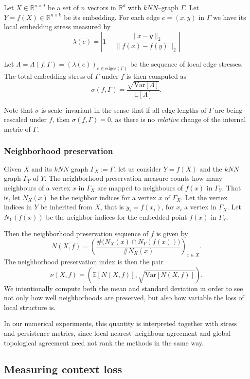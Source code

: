 \documentclass[11pt]{article}
\begin{document}
Let $X \in \mathbb{R}^{n\times d}$ be a set of $n$ vectors in $\mathbb{R}^d$ with $kNN$--graph $\Gamma$. Let $Y = f(X) \in \mathbb{R}^{n\times k}$ be its embedding. For each edge $e = (x,y)$ in $\Gamma$ we have its local embedding stress measured by 
\[
\lambda(e) = \left| 1 - \frac{\|x-y\|_2}{\|f(x) - f(y)\|_2}  \right|
\]

Let $\Lambda = \Lambda(f, \Gamma) = (\lambda(e))_{e \in \text{edges}(\Gamma)}$ be the sequence of local edge stresses.  The total embedding stress of $\Gamma$ under $f$ is then computed as 
\[
\sigma(f, \Gamma) = \frac{\sqrt{\mathrm{Var}[ \Lambda]}}{\mathbb{E}[\Lambda]}.
\]

Note that $\sigma$ is scale--invariant in the sense that if all edge lengths of $\Gamma$ are being rescaled under $f$, then  $\sigma(f, \Gamma) = 0$, as there is no \textit{relative} change of the internal metric of $\Gamma$.

\subsubsection{Neighborhood preservation}

Given $X$ and its $kNN$ graph $\Gamma_X := \Gamma$, let us consider $Y = f(X)$ and the $kNN$ graph $\Gamma_Y$ of $Y$. The neighborhood preservation measure counts how many neighbours of a vertex $x$ in $\Gamma_X$ are mapped to neighbours of $f(x)$ in $\Gamma_Y$. That is, let $N_X(x)$ be the neighbor indices for a vertex $x$ of $\Gamma_X$. Let the vertex indices in $Y$ be inherited from $X$, that is  $y_i = f(x_i)$, for $x_i$ a vertex in $\Gamma_X$. Let $N_Y(f(x))$ be the neighbor indices for the embedded point $f(x)$ in $\Gamma_Y$.

Then the neighborhood preservation sequence of $f$ is given by
\[
N(X, f) = \left( \frac{\# \bigl(N_X(x)\cap N_Y(f(x))\bigr)}{\# N_X(x)} \right)_{x \in X}.
\]
The neighborhood preservation index is then the pair 
\[
\nu(X, f) = \left( \mathbb{E}[N(X,f)], \sqrt{\mathrm{Var}[N(X,f)]} \right). 
\]
We intentionally compute both the mean and standard deviation in order to see not only how well neighborhoods are preserved, but also how variable the loss of local structure is. 

In our numerical experiments, this quantity is interpreted together with stress and persistence metrics, since local nearest--neighbour agreement and global topological agreement need not rank the methods in the same way.   


\subsection{Measuring context loss}
\end{document}

